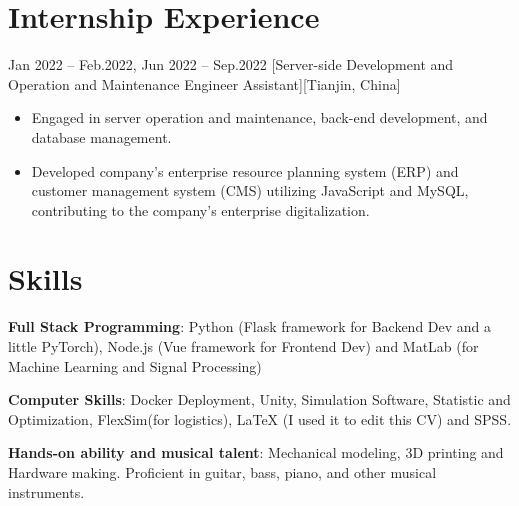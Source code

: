\documentclass{chicv}
\begin{document}
\section{Internship Experience}
%
%
  {Jan 2022 -- Feb.2022, Jun 2022 -- Sep.2022}
  [Server-side Development and Operation and Maintenance Engineer Assistant][Tianjin, China]
  \begin{itemize}
    \item Engaged in server operation and maintenance, back-end development, and database management. 
    \item Developed company's enterprise resource planning system (ERP) and customer management system (CMS) utilizing JavaScript and MySQL, contributing to the company's enterprise digitalization.
  \end{itemize}
%
%
\section{Skills}

\begin{compactlist}
  \item \textbf{Full Stack Programming}: Python (Flask framework for Backend Dev and a little PyTorch), Node.js (Vue framework for Frontend Dev) and MatLab (for Machine Learning and Signal Processing)
  \item \textbf{Computer Skills}: Docker Deployment, Unity, Simulation Software, Statistic and Optimization, FlexSim(for logistics), LaTeX (I used it to edit this CV) and SPSS.
  \item \textbf{Hands-on ability and musical talent}: Mechanical modeling, 3D printing and Hardware making. Proficient in guitar, bass, piano, and other musical instruments.

\end{compactlist}
%
%
% 
%
%
\end{document}
